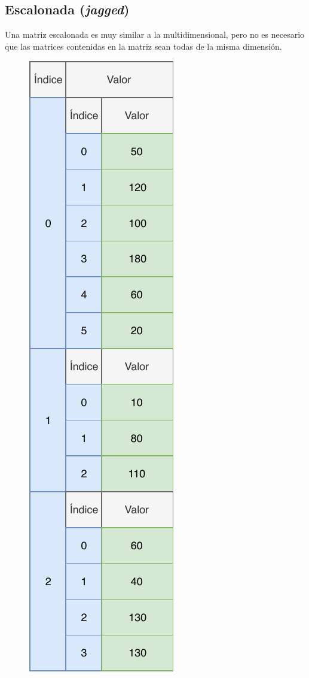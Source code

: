 \documentclass[11pt, oneside]{book}		%
\begin{document}
		\subsection{Escalonada (\textit{jagged})}
		Una matriz escalonada\cite{msdn:matrizescalonada} es muy similar a la multidimensional, pero no es necesario que las matrices contenidas en la matriz sean todas de la misma dimensión.
		\begin{figure}[H]
			\centering
			\includegraphics{img/TiposEnumerables/Matriz/array5.pdf}
		\end{figure}
\end{document}
